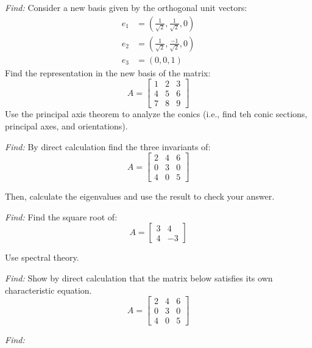 \documentclass[11pt]{homework}
\begin{document}
\maketitle

\question
\emph{Find:}
\newline
Consider a new basis given by the orthogonal unit vectors:
\begin{align*}
e_1 &= 
  \left( \frac{1}{\sqrt{2}}, \frac{1}{\sqrt{2}}, 0 \right) \\
e_2 &= 
  \left( \frac{1}{\sqrt{2}}, \frac{-1}{\sqrt{2}}, 0 \right) \\
e_3 &= 
  \left( 0,0,1 \right)
\end{align*}
\noindent
Find the representation in the new basis of the matrix:
\begin{equation*}
A = 
  \begin{bmatrix}
    1 & 2 & 3 \\
    4 & 5 & 6 \\
    7 & 8 & 9 
  \end{bmatrix}
\end{equation*}
\noindent
Use the principal axis theorem to analyze the conics
(i.e., find teh conic sections, principal axes, and orientations).

\question
\emph{Find:}
\newline
By direct calculation find the three invariants of:
\begin{equation*}
A = 
  \begin{bmatrix}
  2 & 4 & 6 \\
  0 & 3 & 0 \\
  4 & 0 & 5
  \end{bmatrix}
\end{equation*}

Then, calculate the eigenvalues and use the result to check your answer.

\question
\emph{Find:}
\newline
Find the square root of:
\begin{equation*}
A = 
  \begin{bmatrix}
  3 & 4 \\
  4 & -3 
  \end{bmatrix}
\end{equation*}

Use spectral theory. 

\question
\emph{Find:}
\newline
Show by direct calculation that the matrix below 
satisfies its own characteristic equation.
\begin{equation*}
A = 
  \begin{bmatrix}
  2 & 4 & 6 \\
  0 & 3 & 0 \\
  4 & 0 & 5
  \end{bmatrix}
\end{equation*}

\emph{Find:}
\newline
\end{document}
